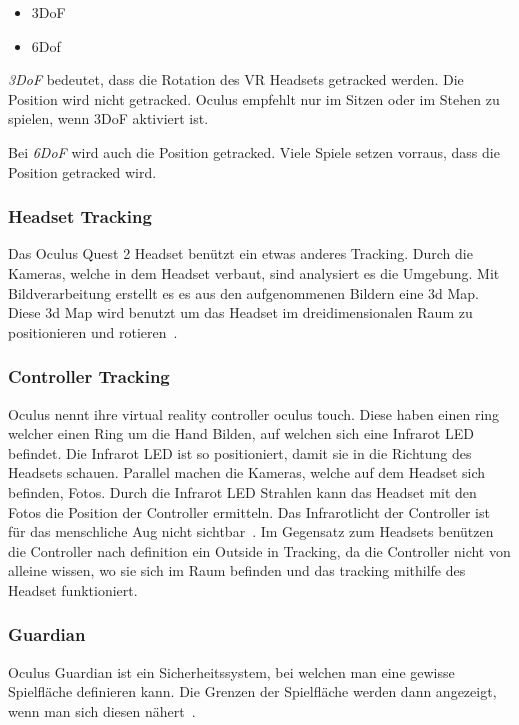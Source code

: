 \begin{itemize}
    \item 3DoF
    \item 6Dof
\end{itemize}

\emph{3DoF} bedeutet, dass die Rotation des VR Headsets getracked werden.
Die Position wird nicht getracked.
Oculus empfehlt nur im Sitzen oder im Stehen zu spielen, wenn 3DoF aktiviert ist.

Bei \emph{6DoF} wird auch die Position getracked.
Viele Spiele setzen vorraus, dass die Position getracked wird.

\subsubsection{Headset Tracking}

Das Oculus Quest 2 Headset benützt ein etwas anderes Tracking.
Durch die Kameras, welche in dem Headset verbaut, sind analysiert es die Umgebung.
Mit Bildverarbeitung erstellt es es aus den aufgenommenen Bildern eine 3d Map.
Diese 3d Map wird benutzt um das Headset im dreidimensionalen Raum zu positionieren und rotieren~\cite{MECHATECH}.

\subsubsection{Controller Tracking}

Oculus nennt ihre virtual reality controller oculus touch.
Diese haben einen ring welcher einen Ring um die Hand Bilden, auf welchen sich eine Infrarot LED befindet.
Die Infrarot LED ist so positioniert, damit sie in die Richtung des Headsets schauen.
Parallel machen die Kameras, welche auf dem Headset sich befinden, Fotos.
Durch die Infrarot LED Strahlen kann das Headset mit den Fotos die Position der Controller ermitteln.
Das Infrarotlicht der Controller ist für das menschliche Aug nicht sichtbar~\cite{Gajsek_2022}.
Im Gegensatz zum Headsets benützen die Controller nach definition ein Outside in Tracking, da die Controller nicht von alleine wissen, wo sie sich im Raum befinden und das tracking mithilfe des Headset funktioniert.

\subsubsection{Guardian}

Oculus Guardian ist ein Sicherheitssystem, bei welchen man eine gewisse Spielfläche definieren kann.
Die Grenzen der Spielfläche werden dann angezeigt, wenn man sich diesen nähert~\cite{Oculus_Guardien}.

